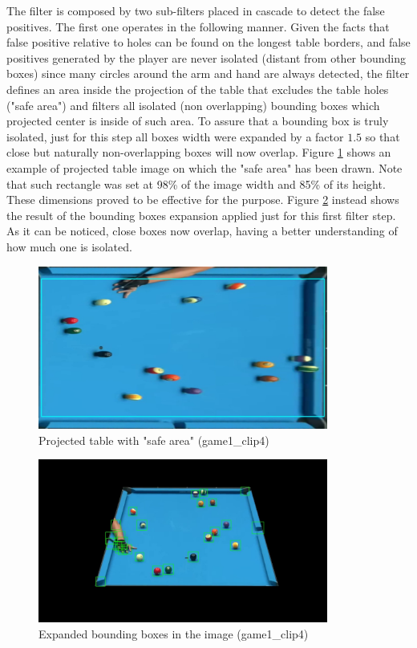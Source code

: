 The filter is composed by two sub-filters placed in cascade to detect the false positives.
The first one operates in the following manner. Given the facts that false positive relative to holes can be found on the longest table
borders, and false positives generated by the player are never isolated (distant from other bounding boxes) since
many circles around the arm and hand are always detected, the filter defines an area inside the projection of the table that excludes
the table holes ("safe area") and filters all isolated (non overlapping) bounding boxes which projected center is inside of such area.
To assure that a bounding box is truly isolated, just for this step all boxes width were expanded by a factor $1.5$ so that close but naturally
non-overlapping boxes will now overlap. Figure \ref{fig:safe_area} shows an example of projected table image on which the "safe area" has been drawn.
Note that such rectangle was set at 98\% of the image width and 85\% of its height. These dimensions proved to be effective for the purpose. 
Figure \ref{fig:exp_bboxes} instead shows the result of the bounding boxes expansion applied just for this first filter step. As it can be noticed, close
boxes now overlap, having a better understanding of how much one is isolated.\\
\begin{figure}[h!]
    \centering
    \includegraphics[width=0.85\textwidth]{imgs/ball_localization/safe_area.jpg}
    \caption{Projected table with "safe area" (game1\_clip4)}
    \label{fig:safe_area}
\end{figure}
\begin{figure}[h!]
    \centering
    \includegraphics[width=0.85\textwidth]{imgs/ball_localization/exp_boxes_filter.jpg}
    \caption{Expanded bounding boxes in the image (game1\_clip4)}
    \label{fig:exp_bboxes}
\end{figure}


